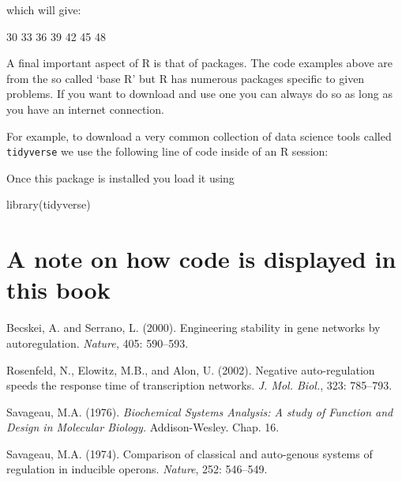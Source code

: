 which will give:

\begin{Rout}
30
33
36
39
42
45
48
\end{Rout}

A final important aspect of R is that of packages. The code examples above
are from the so called `base R' but R has numerous packages
specific to given problems. If you want to download and use one you can always
do so as long as you have an internet connection.

For example, to download a very common collection of data science tools called
\texttt{tidyverse}
we use the following line of code inside of an R session:

\begin{Rin}
install.packages{"tidyverse")
\end{Rin}

Once this package is installed you load it using

\begin{Rin}
library(tidyverse)
\end{Rin}

\section{A note on how code is displayed in this
book}\label{sec:a-note-on-how-code-is-displayed-in-this-book}


\begin{thefurtherreading}{99}  %

\bibitem{} Becskei, A. and Serrano, L. (2000). Engineering stability in gene
networks by autoregulation. \textit{Nature, }405: 590--593.

\bibitem{} Rosenfeld, N., Elowitz, M.B., and Alon, U. (2002). Negative
auto-regulation speeds the response time of transcription networks. \textit{J.
Mol. Biol.}, 323: 785--793.

\bibitem{} Savageau, M.A. (1976). \textit{Biochemical Systems Analysis: A study
of Function and Design in Molecular Biology. }Addison-Wesley. Chap. 16.

\bibitem{} Savageau, M.A. (1974). Comparison of classical and auto-genous
systems of regulation in inducible operons. \textit{Nature}, 252: 546--549.
\end{thefurtherreading}
